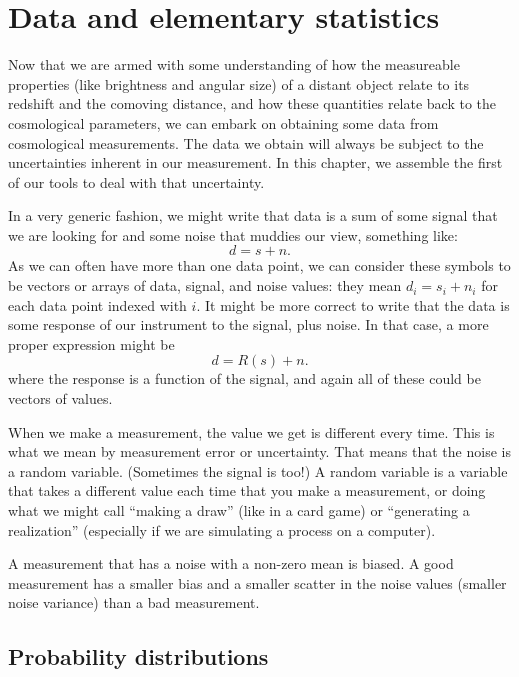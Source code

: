 \chapter{Data and elementary statistics} \label{ch:data}
Now that we are armed with some understanding of how the measureable properties (like brightness and angular size) of a distant object relate to its redshift and the comoving distance, and how these quantities relate back to the cosmological parameters, we can embark on obtaining some data from cosmological measurements.  The data we obtain will always be subject to the uncertainties inherent in our measurement.  In this chapter, we assemble the first of our tools to deal with that uncertainty.

In a very generic fashion, we might write that data is a sum of some signal that we are looking for and some noise that muddies our view, something like:
\begin{equation}
  d = s + n.
\end{equation}
As we can often have more than one data point, we can consider these symbols to be vectors or arrays of data, signal, and noise values: they mean $d_i = s_i + n_i$ for each data point indexed with $i$.  It might be more correct to write that the data is some response of our instrument to the signal, plus noise.  In that case, a more proper expression might be
\begin{equation}
  d = R(s) + n.
\end{equation}
where the response is a function of the signal, and again all of these could be vectors of values.

When we make a measurement, the value we get is different every time.  This is what we mean by measurement error or uncertainty.  That means that the noise is a random variable. (Sometimes the signal is too!)  A random variable is a variable that takes a different value each time that you make a measurement, or doing what we might call  ``making a draw'' (like in a card game) or ``generating a realization'' (especially if we are simulating a process on a computer).

A measurement that has a noise with a non-zero mean is biased.  A good measurement has a smaller bias and a smaller scatter in the noise values (smaller noise variance) than a bad measurement. 

\section{Probability distributions}

